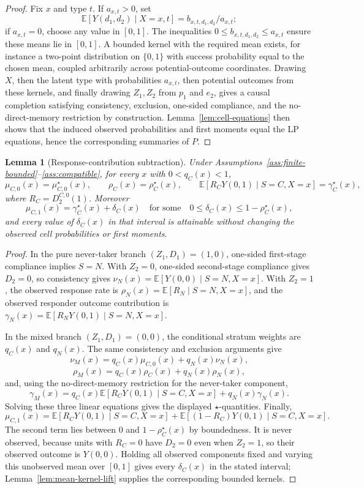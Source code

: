 \documentclass[11pt]{article}
\newcommand{\E}{\mathbb{E}}
\theoremstyle{definition}
\theoremstyle{plain}
\newtheorem{lemma}{Lemma}
\theoremstyle{remark}
\begin{document}
\begin{proof}
Fix \(x\) and type \(t\).  If \(a_{x,t}>0\), set
\[
\E[Y(d_1,d_2)\mid X=x,t]=b_{x,t,d_1,d_2}/a_{x,t};
\]
if \(a_{x,t}=0\), choose any value in \([0,1]\).  The inequalities \(0\le b_{x,t,d_1,d_2}\le a_{x,t}\) ensure these means lie in \([0,1]\).  A bounded kernel with the required mean exists, for instance a two-point distribution on \(\{0,1\}\) with success probability equal to the chosen mean, coupled arbitrarily across potential-outcome coordinates.  Drawing \(X\), then the latent type with probabilities \(a_{x,t}\), then potential outcomes from these kernels, and finally drawing \(Z_1,Z_2\) from \(p_1\) and \(e_2\), gives a causal completion satisfying consistency, exclusion, one-sided compliance, and the no-direct-memory restriction by construction.  Lemma~\ref{lem:cell-equations} then shows that the induced observed probabilities and first moments equal the LP equations, hence the corresponding summaries of \(P\).
\end{proof}

\begin{lemma}[Response-contribution subtraction]\label{lem:response-contribution}
Under Assumptions~\ref{ass:finite-bounded}--\ref{ass:compatible}, for every \(x\) with \(0<q_C(x)<1\),
\[
\mu_{C,0}(x)=\mu_{C,0}^{\star}(x),\qquad
\rho_C(x)=\rho_C^{\star}(x),\qquad
\E[R_CY(0,1)\mid S=C,X=x]=\gamma_C^{\star}(x),
\]
where \(R_C=D_2^{C,0}(1)\).  Moreover
\[
\mu_{C,1}(x)=\gamma_C^{\star}(x)+\delta_C(x)
\quad\text{for some}\quad
0\le\delta_C(x)\le1-\rho_C^{\star}(x),
\]
and every value of \(\delta_C(x)\) in that interval is attainable without changing the observed cell probabilities or first moments.
\end{lemma}

\begin{proof}
In the pure never-taker branch \((Z_1,D_1)=(1,0)\), one-sided first-stage compliance implies \(S=N\).  With \(Z_2=0\), one-sided second-stage compliance gives \(D_2=0\), so consistency gives
\(\nu_N(x)=\E[Y(0,0)\mid S=N,X=x]\).  With \(Z_2=1\), the observed response rate is
\(\rho_N(x)=\E[R_N\mid S=N,X=x]\), and the observed responder outcome contribution is
\(\gamma_N(x)=\E[R_NY(0,1)\mid S=N,X=x]\).

In the mixed branch \((Z_1,D_1)=(0,0)\), the conditional stratum weights are \(q_C(x)\) and \(q_N(x)\).  The same consistency and exclusion arguments give
\[
\nu_M(x)=q_C(x)\mu_{C,0}(x)+q_N(x)\nu_N(x),
\]
\[
\rho_M(x)=q_C(x)\rho_C(x)+q_N(x)\rho_N(x),
\]
and, using the no-direct-memory restriction for the never-taker component,
\[
\gamma_M(x)=q_C(x)\E[R_CY(0,1)\mid S=C,X=x]+q_N(x)\gamma_N(x).
\]
Solving these three linear equations gives the displayed \(\star\)-quantities.  Finally,
\[
\mu_{C,1}(x)
=\E[R_CY(0,1)\mid S=C,X=x]
 +\E[(1-R_C)Y(0,1)\mid S=C,X=x].
\]
The second term lies between \(0\) and \(1-\rho_C^{\star}(x)\) by boundedness.  It is never observed, because units with \(R_C=0\) have \(D_2=0\) even when \(Z_2=1\), so their observed outcome is \(Y(0,0)\).  Holding all observed components fixed and varying this unobserved mean over \([0,1]\) gives every \(\delta_C(x)\) in the stated interval; Lemma~\ref{lem:mean-kernel-lift} supplies the corresponding bounded kernels.
\end{proof}
\end{document}
